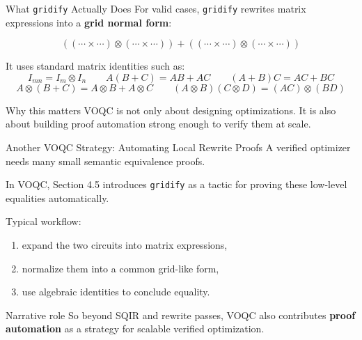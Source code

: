 \documentclass[aspectratio=169]{beamer}
\begin{document}
\begin{frame}{What \texttt{gridify} Actually Does}
\justifying
For valid cases, \texttt{gridify} rewrites matrix expressions into a
\textbf{grid normal form}:

\[
((\cdots \times \cdots)\otimes(\cdots \times \cdots))
+
((\cdots \times \cdots)\otimes(\cdots \times \cdots))
\]

\vspace{0.7em}
It uses standard matrix identities such as:
\[
I_{mn} = I_m \otimes I_n
\qquad
A(B+C)=AB+AC
\qquad
(A+B)C=AC+BC
\]
\[
A \otimes (B+C)=A\otimes B + A\otimes C
\qquad
(A\otimes B)(C\otimes D)=(AC)\otimes(BD)
\]

\vspace{0.7em}
\begin{alertblock}{Why this matters}
VOQC is not only about designing optimizations.
It is also about building proof automation strong enough to verify them at scale.
\end{alertblock}
\end{frame}

\begin{frame}{Another VOQC Strategy: Automating Local Rewrite Proofs}
\justifying
A verified optimizer needs many small semantic equivalence proofs.

\vspace{0.7em}
In VOQC, Section 4.5 introduces \texttt{gridify} as a tactic for proving these
low-level equalities automatically.

\vspace{0.7em}
Typical workflow:
\begin{enumerate}
    \item expand the two circuits into matrix expressions,
    \item normalize them into a common grid-like form,
    \item use algebraic identities to conclude equality.
\end{enumerate}

\vspace{0.7em}
\begin{alertblock}{Narrative role}
So beyond SQIR and rewrite passes, VOQC also contributes \textbf{proof automation}
as a strategy for scalable verified optimization.
\end{alertblock}
\end{frame}
\end{document}
